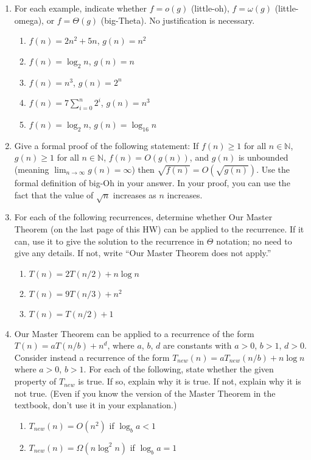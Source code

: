 \documentclass{article}
\begin{document}
\begin{enumerate}
    \item For each example, indicate whether $f = o(g)$ (little-oh), $f = \omega(g)$ (little-omega), or $f = \Theta(g)$ (big-Theta). No justification is necessary.
    \begin{enumerate}
        \item $f(n) = 2n^2 + 5n$, $g(n) = n^2$
        \item $f(n) = \log_2 n$, $g(n) = n$
        \item $f(n) = n^3$, $g(n) = 2^n$
        \item $f(n) = 7 \sum_{i=0}^n 2^i$, $g(n) = n^3$
        \item $f(n) = \log_2 n$, $g(n) = \log_{16} n$
    \end{enumerate}

    \item Give a formal proof of the following statement: If $f(n) \ge 1$ for all $n \in \mathbb{N}$, $g(n) \ge 1$ for all $n \in \mathbb{N}$, $f(n) = O(g(n))$, and $g(n)$ is unbounded (meaning $\lim_{n \to \infty} g(n) = \infty$) then $\sqrt{f(n)} = O(\sqrt{g(n)})$.
    Use the formal definition of big-Oh in your answer. In your proof, you can use the fact that the value of $\sqrt{n}$ increases as $n$ increases.

    \item For each of the following recurrences, determine whether Our Master Theorem (on the last page of this HW) can be applied to the recurrence. If it can, use it to give the solution to the recurrence in $\Theta$ notation; no need to give any details. If not, write “Our Master Theorem does not apply.”
    \begin{enumerate}
        \item $T(n) = 2T(n/2) + n \log n$
        \item $T(n) = 9T(n/3) + n^2$
        \item $T(n) = T(n/2) + 1$
    \end{enumerate}

    \item Our Master Theorem can be applied to a recurrence of the form $T(n) = aT(n/b) + n^d$, where $a$, $b$, $d$ are constants with $a > 0$, $b > 1$, $d > 0$. Consider instead a recurrence of the form $T_{new}(n) = aT_{new}(n/b) + n \log n$ where $a > 0$, $b > 1$.
    For each of the following, state whether the given property of $T_{new}$ is true. If so, explain why it is true. If not, explain why it is not true. (Even if you know the version of the Master Theorem in the textbook, don’t use it in your explanation.)
    \begin{enumerate}
        \item $T_{new}(n) = O(n^2)$ if $\log_b a < 1$
        \item $T_{new}(n) = \Omega(n \log^2 n)$ if $\log_b a = 1$
    \end{enumerate}


\end{enumerate}
\end{document}

